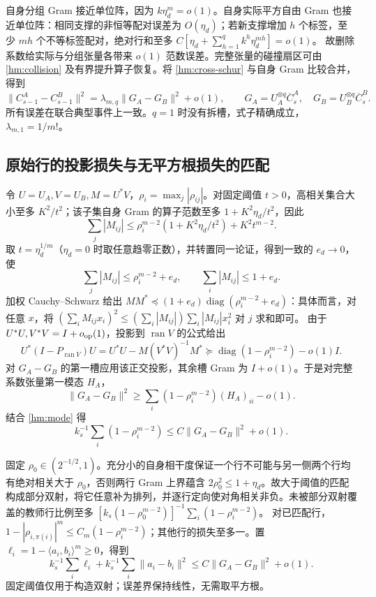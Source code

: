\documentclass[a4paper]{tufte-handout}
\begin{document}
\begin{fullwidth}
自身分组 Gram 接近单位阵，因为 $k\eta_d^m=o(1)$。自身实际平方自由 Gram 也接近单位阵：相同支撑的非恒等配对误差为 $O(\eta_d)$；若新支撑增加 $h$ 个标签，至少 $mh$ 个不等标签配对，绝对行和至多
$C[\eta_d+\sum_{h=1}^q k^h\eta_d^{mh}]=o(1)$。
故删除系数给实际与分组张量各带来 $o(1)$ 范数误差。完整张量的碰撞扇区可由 \eqref{hm:collision} 及有界提升算子恢复。将 \eqref{hm:cross-schur} 与自身 Gram 比较合并，得到
\begin{equation}\label{hm:sym-group}
 \|C_{s-1}^A-C_{s-1}^B\|^2
 =\lambda_{m,q}\|G_A-G_B\|^2+o(1),\qquad
 G_A=U_A^{\otimes q}\overline C_s^A,\quad G_B=U_B^{\otimes q}\overline C_s^B.
\end{equation}
所有误差在联合典型事件上一致。$q=1$ 时没有拆槽，式子精确成立，$\lambda_{m,1}=1/m!$。

\subsection{原始行的投影损失与无平方根损失的匹配}
令 $U=U_A,V=U_B,M=U^*V$，$\rho_i=\max_j|\rho_{ij}|$。对固定阈值 $t>0$，高相关集合大小至多 $K^2/t^2$；该子集自身 Gram 的算子范数至多 $1+K^2\eta_d/t^2$，因此
\[
 \sum_j|M_{ij}|\le \rho_i^{m-2}(1+K^2\eta_d/t^2)+K^2t^{m-2}.
\]
取 $t=\eta_d^{1/m}$（$\eta_d=0$ 时取任意趋零正数），并转置同一论证，得到一致的 $e_d\to0$，使
\begin{equation}\label{hm:cross-power}
 \sum_j|M_{ij}|\le\rho_i^{m-2}+e_d,\qquad
 \sum_i|M_{ij}|\le1+e_d.
\end{equation}
加权 Cauchy--Schwarz 给出
$MM^*\preceq(1+e_d)\operatorname{diag}(\rho_i^{m-2}+e_d)$：具体而言，对任意 $x$，将
$(\sum_iM_{ij}x_i)^2\le(\sum_i|M_{ij}|)\sum_i|M_{ij}|x_i^2$ 对 $j$ 求和即可。
由于 $U^*U,V^*V=I+o_{\rm op}(1)$，投影到 $\operatorname{ran}V$ 的公式给出
\[
 U^*(I-P_{\operatorname{ran}V})U
 =U^*U-M(V^*V)^{-1}M^*
 \succeq\operatorname{diag}(1-\rho_i^{m-2})-o(1)I.
\]
对 $G_A-G_B$ 的第一槽应用该正交投影，其余槽 Gram 为 $I+o(1)$。于是对完整系数张量第一模态 $H_A$，
\begin{equation}\label{hm:projection-loss}
 \|G_A-G_B\|^2\ge\sum_i(1-\rho_i^{m-2})(H_A)_{ii}-o(1).
\end{equation}
结合 \eqref{hm:mode} 得
\begin{equation}\label{hm:projective-match}
 k_s^{-1}\sum_i(1-\rho_i^{m-2})\le C\|G_A-G_B\|^2+o(1).
\end{equation}

固定 $\rho_0\in(2^{-1/2},1)$。充分小的自身相干度保证一个行不可能与另一侧两个行均有绝对相关大于 $\rho_0$，否则两行 Gram 上界蕴含 $2\rho_0^2\le1+\eta_d$。故大于阈值的匹配构成部分双射，将它任意补为排列，并逐行定向使对角相关非负。未被部分双射覆盖的教师行比例至多
$[k_s(1-\rho_0^{m-2})]^{-1}\sum_i(1-\rho_i^{m-2})$。
对已匹配行，$1-|\rho_{i,\pi(i)}|^m\le C_m(1-\rho_i^{m-2})$；其他行的损失至多一。置
$\ell_i=1-\langle a_i,b_i\rangle^m\ge0$，得到
\begin{equation}\label{hm:row-loss}
 k_s^{-1}\sum_i\ell_i+k_s^{-1}\sum_i\|a_i-b_i\|^2
 \le C\|G_A-G_B\|^2+o(1).
\end{equation}
固定阈值仅用于构造双射；误差界保持线性，无需取平方根。


\end{fullwidth}
\end{document}
